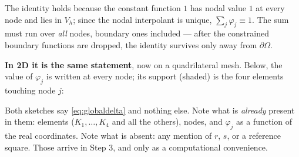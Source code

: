 \documentclass[11pt]{article}
\begin{document}
\medskip
{\small\color{black!60}The identity holds because the constant function $1$ has
nodal value $1$ at every node and lies in $V_{h}$; since the nodal interpolant
is unique, $\sum_{j}\varphi_{j}\equiv1$. The sum must run over \emph{all}
nodes, boundary ones included --- after the constrained boundary functions are
dropped, the identity survives only away from $\partial\Omega$.}

\medskip
\noindent
\textbf{In 2D it is the same statement}, now on a quadrilateral mesh. Below,
the value of $\varphi_{j}$ is written at every node; its support (shaded) is
the four elements touching node $j$:

\begin{center}
\end{center}

\noindent
Both sketches say \eqref{eq:globaldelta} and nothing else. Note what is
\emph{already} present in them: elements ($K_{1},\dots,K_{4}$ and all the
others), nodes, and $\varphi_{j}$ as a function of the real coordinates. Note
what is absent: any mention of $r$, $s$, or a reference square. Those arrive in
Step 3, and only as a computational convenience.
\end{document}
